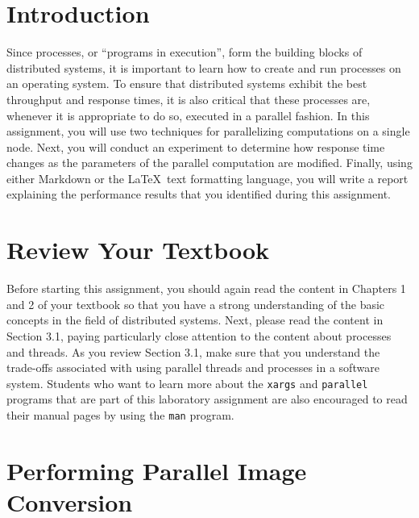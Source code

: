 


\usepackage[compact]{titlesec}



\section*{Introduction}

Since processes, or ``programs in execution'', form the building blocks of distributed systems, it is important to learn
how to create and run processes on an operating system. To ensure that distributed systems exhibit the best throughput
and response times, it is also critical that these processes are, whenever it is appropriate to do so, executed in a
parallel fashion. In this assignment, you will use two techniques for parallelizing computations on a single node. Next,
you will conduct an experiment to determine how response time changes as the parameters of the parallel computation are
modified.  Finally, using either Markdown or the \LaTeX~text formatting language, you will write a report explaining the
performance results that you identified during this assignment.

\section*{Review Your Textbook}

Before starting this assignment, you should again read the content in Chapters 1 and 2 of your textbook so that you have
a strong understanding of the basic concepts in the field of distributed systems. Next, please read the content in
Section 3.1, paying particularly close attention to the content about processes and threads. As you review Section 3.1,
make sure that you understand the trade-offs associated with using parallel threads and processes in a software system.
Students who want to learn more about the {\tt xargs} and {\tt parallel} programs that are part of this laboratory
assignment are also encouraged to read their manual pages by using the {\tt man} program.

\section*{Performing Parallel Image Conversion}

